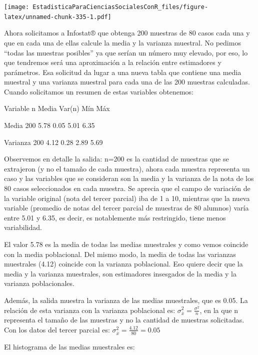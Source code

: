 \documentclass[]{book}
\begin{document}
\texttt{[image: EstadisticaParaCienciasSocialesConR\_files/figure-latex/unnamed-chunk-335-1.pdf]}

Ahora solicitamos a Infostat® que obtenga 200 muestras de 80 casos cada
una y que en cada una de ellas calcule la media y la varianza muestral.
No pedimos ``todas las muestras posibles'' ya que serían un número muy
elevado, por eso, lo que tendremos será una aproximación a la relación
entre estimadores y parámetros. Esa solicitud da lugar a una nueva tabla
que contiene una media muestral y una varianza muestral para cada una de
las 200 muestras calculadas. Cuando solicitamos un resumen de estas
variables obtenemos:

Variable n Media Var(n) Mín Máx

Media 200 5.78 0.05 5.01 6.35

Varianza 200 4.12 0.28 2.89 5.69

Observemos en detalle la salida: n=200 es la cantidad de muestras que se
extrajeron (y no el tamaño de cada muestra), ahora cada muestra
representa un caso y las variables que se consideran son la media y la
varianza de la nota de los 80 casos seleccionados en cada muestra. Se
aprecia que el campo de variación de la variable original (nota del
tercer parcial) iba de 1 a 10, mientras que la nueva variable (promedio
de notas del tercer parcial de muestras de 80 alumnos) varía entre 5.01
y 6.35, es decir, es notablemente más restringido, tiene menos
variabilidad.

El valor 5.78 es la media de todas las medias muestrales y como vemos
coincide con la media poblacional. Del mismo modo, la media de todas las
varianzas muestrales (4.12) coincide con la varianza poblacional. Eso
quiere decir que la media y la varianza muestrales, son estimadores
insesgados de la media y la varianza poblacionales.

Además, la salida muestra la varianza de las medias muestrales, que es
0.05. La relación de esta varianza con la varianza poblacional es:
\(\sigma_{\overline{x}}^{2} = \frac{\sigma^{2}}{n}\), en la que n
representa el tamaño de las muestras y no la cantidad de muestras
solicitadas. Con los datos del tercer parcial es:
\(\sigma_{\overline{x}}^{2} = \frac{4.12}{80} = 0.05\)

El histograma de las medias muestrales es:
\end{document}

